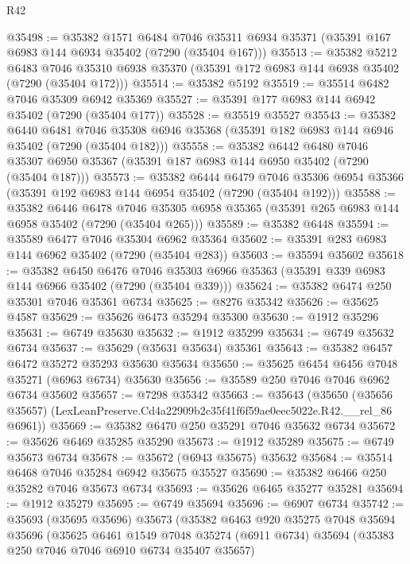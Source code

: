 \begin{lexlean}{R42}
\begin{coremodule}
{@35498 := @35382
    @1571
    @6484
    @7046
    @35311
    @6934
    @35371
    (@35391 @167 @6983 @144 @6934 @35402 (@7290 (@35404 @167)))
@35513 := @35382
    @5212
    @6483
    @7046
    @35310
    @6938
    @35370
    (@35391 @172 @6983 @144 @6938 @35402 (@7290 (@35404 @172)))
@35514 := @35382 @5192
@35519 := @35514 @6482 @7046 @35309 @6942 @35369
@35527 := @35391 @177 @6983 @144 @6942 @35402 (@7290 (@35404 @177))
@35528 := @35519 @35527
@35543 := @35382
    @6440
    @6481
    @7046
    @35308
    @6946
    @35368
    (@35391 @182 @6983 @144 @6946 @35402 (@7290 (@35404 @182)))
@35558 := @35382
    @6442
    @6480
    @7046
    @35307
    @6950
    @35367
    (@35391 @187 @6983 @144 @6950 @35402 (@7290 (@35404 @187)))
@35573 := @35382
    @6444
    @6479
    @7046
    @35306
    @6954
    @35366
    (@35391 @192 @6983 @144 @6954 @35402 (@7290 (@35404 @192)))
@35588 := @35382
    @6446
    @6478
    @7046
    @35305
    @6958
    @35365
    (@35391 @265 @6983 @144 @6958 @35402 (@7290 (@35404 @265)))
@35589 := @35382 @6448
@35594 := @35589 @6477 @7046 @35304 @6962 @35364
@35602 := @35391 @283 @6983 @144 @6962 @35402 (@7290 (@35404 @283))
@35603 := @35594 @35602
@35618 := @35382
    @6450
    @6476
    @7046
    @35303
    @6966
    @35363
    (@35391 @339 @6983 @144 @6966 @35402 (@7290 (@35404 @339)))
@35624 := @35382 @6474 @250 @35301 @7046 @35361 @6734
@35625 := @8276 @35342
@35626 := @35625 @4587
@35629 := @35626 @6473 @35294 @35300
@35630 := @1912 @35296
@35631 := @6749 @35630
@35632 := @1912 @35299
@35634 := @6749 @35632 @6734
@35637 := @35629 (@35631 @35634) @35361
@35643 := @35382 @6457 @6472 @35272 @35293 @35630 @35634
@35650 := @35625 @6454 @6456 @7048 @35271 (@6963 @6734) @35630
@35656 := @35589 @250 @7046 @7046 @6962 @6734 @35602
@35657 := @7298 @35342
@35663 := @35643
    (@35650 (@35656 @35657) (LexLeanPreserve.Cd4a22909b2c35f41f6f59ae0eec5022e.R42.__rel_86 @6961))
@35669 := @35382 @6470 @250 @35291 @7046 @35632 @6734
@35672 := @35626 @6469 @35285 @35290
@35673 := @1912 @35289
@35675 := @6749 @35673 @6734
@35678 := @35672 (@6943 @35675) @35632
@35684 := @35514 @6468 @7046 @35284 @6942 @35675 @35527
@35690 := @35382 @6466 @250 @35282 @7046 @35673 @6734
@35693 := @35626 @6465 @35277 @35281
@35694 := @1912 @35279
@35695 := @6749 @35694
@35696 := @6907 @6734
@35742 := @35693
    (@35695 @35696)
    @35673
    (@35382
      @6463
      @920
      @35275
      @7048
      @35694
      @35696
      (@35625
        @6461
        @1549
        @7048
        @35274
        (@6911 @6734)
        @35694
        (@35383 @250 @7046 @7046 @6910 @6734 @35407 @35657)
}
\end{coremodule}
\end{lexlean}
